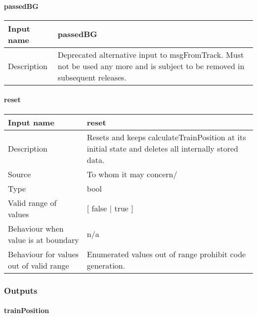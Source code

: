 \paragraph{passedBG}

\begin{longtable}{p{}p{}}
\toprule
Input name				& passedBG \\

\midrule
Description				& Deprecated alternative input to msgFromTrack. Must not be used any more and is subject to be removed in subsequent releases.  \newline
  \\

\bottomrule
\end{longtable}


\paragraph{reset}

\begin{longtable}{p{}p{}}
\toprule
Input name				& reset \\

\midrule
Description				& Resets and keeps calculateTrainPosition at its initial state and deletes all internally stored data. \newline
  \\
\midrule
Source					& To whom it may concern/ \\ 
\midrule
Type					& bool \\  
\midrule
Valid range of values	& [ false | true ] \\

\midrule
Behaviour when value is at boundary	& n/a \\
\midrule
Behaviour for values out of valid range	& Enumerated values out of range prohibit code generation. \\

\bottomrule
\end{longtable}


\subsubsection{Outputs}\label{s:calculateTrainPosition_outputs}

\paragraph{trainPosition}

